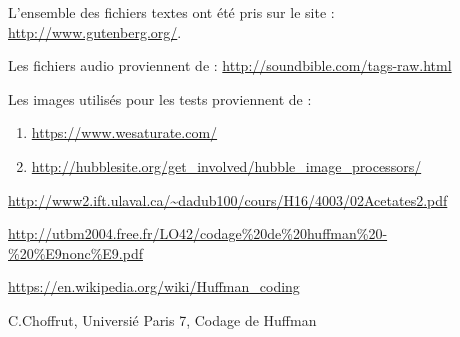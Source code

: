 \documentclass{article}
\begin{document}
L'ensemble des fichiers textes ont \'et\'e pris sur le site : \url{http://www.gutenberg.org/}.

Les fichiers audio proviennent de : \url{http://soundbible.com/tags-raw.html}

Les images utilis\'es pour les tests proviennent de :
\begin{enumerate}
\item \url{ https://www.wesaturate.com/}
\item \url{http://hubblesite.org/get_involved/hubble_image_processors/}
\end{enumerate}

\url{http://www2.ift.ulaval.ca/~dadub100/cours/H16/4003/02Acetates2.pdf}

\url{http://utbm2004.free.fr/LO42/codage\%20de\%20huffman\%20-\%20\%E9nonc\%E9.pdf}

\url{https://en.wikipedia.org/wiki/Huffman_coding}

C.Choffrut, Universi\'e Paris 7, Codage de Huffman
\end{document}
